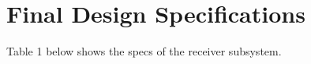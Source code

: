 \documentclass[12pt]{article}
\begin{document}

\hfill 
\pagebreak
\hfill

\section{Final Design Specifications}

\indent
Table 1 below shows the specs of the receiver subsystem.
\hfill





\end{document}
